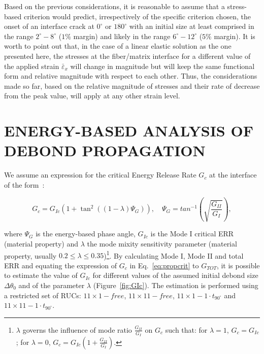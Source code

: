 \documentclass[12pt,a4paper]{article}
\begin{document}
\vspace{-5pt}
Based on the previous considerations, it is reasonable to assume that a stress-based criterion would predict, irrespectively of the specific criterion chosen, the onset of an interface crack at $0^{\circ}$ or $180^{\circ}$ with an initial size at least comprised in the range $2^{\circ}-8^{\circ}$ ($1\%$ margin) and likely in the range $6^{\circ}-12^{\circ}$ ($5\%$ margin). It is worth to point out that, in the case of a linear elastic solution as the one presented here, the stresses at the fiber/matrix interface for a different value of the applied strain $\bar{\varepsilon}_{x}$ will change in magnitude but will keep the same functional form and relative magnitude with respect to each other. Thus, the considerations made so far, based on the relative magnitude of stresses and their rate of decrease from the peak value, will apply at any other strain level.

\section{ENERGY-BASED ANALYSIS OF DEBOND PROPAGATION}

We assume an expression for the critical Energy Release Rate $G_{c}$ at the interface of the form~\cite{Hutchinson1991,Mantic2009}:

\begin{equation}\label{eq:propcrit}
G_{c}=G_{Ic}\left(1+\tan^{2}\left(\left(1-\lambda\right)\Psi_{G}\right)\right),\quad\Psi_{G}=tan^{-1}\left(\sqrt{\frac{G_{II}}{G_{I}}}\right),
\end{equation}

where $\Psi_{G}$ is the energy-based phase angle, $G_{Ic}$ is the Mode I critical ERR (material property) and $\lambda$ the mode mixity sensitivity parameter (material property, usually $0.2\leq\lambda\leq0.35$)\footnote{$\lambda$ governs the influence of mode ratio $\frac{G_{II}}{G_{I}}$ on $G_{c}$ such that: for $\lambda=1$, $G_{c}=G_{Ic}$; for $\lambda=0$, $G_{c}=G_{Ic}\left(1+\frac{G_{II}}{G_{I}}\right)$.}. By calculating Mode I, Mode II and total ERR and equating the expression of $G_{c}$ in Eq.~\ref{eq:propcrit} to $G_{TOT}$, it is possible to estimate the value of $G_{Ic}$ for different values of the assumed initial debond size $\Delta\theta_{0}$ and of the parameter $\lambda$ (Figure~\ref{fig:GIc}). The estimation is performed using a restricted set of RUCs: $11\times 1-free$, $11\times 11-free$, $11\times 1-1\cdot t_{90^{\circ}}$ and $11\times 11-1\cdot t_{90^{\circ}}$.
\end{document}
